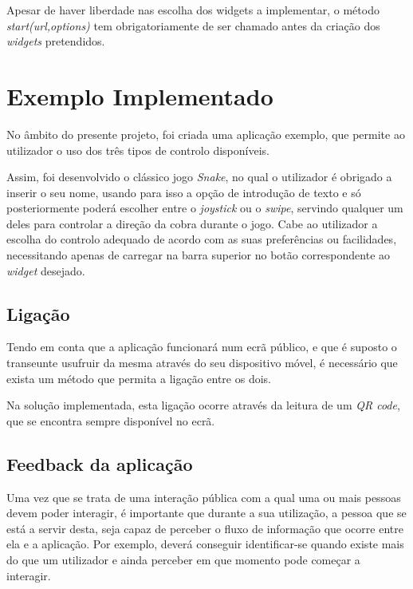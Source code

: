 	Apesar de haver liberdade nas escolha dos widgets a implementar, o método \textit{start(url,options)} tem obrigatoriamente de ser chamado antes da criação dos \textit{widgets} pretendidos. 


	
\section{Exemplo Implementado} \label{sec:exemplo}

	No âmbito do presente projeto, foi criada uma aplicação exemplo, que permite ao utilizador o uso dos três tipos de controlo disponíveis. 

	Assim, foi desenvolvido o clássico jogo \textit{Snake}, no qual o utilizador é obrigado a inserir o seu nome, usando para isso a opção de introdução de texto e só posteriormente poderá escolher entre o \textit{joystick} ou o \textit{swipe}, servindo qualquer um deles para controlar a direção da cobra durante o jogo. Cabe ao utilizador a escolha do controlo adequado de acordo com as suas preferências ou facilidades, necessitando apenas de carregar na barra superior no botão correspondente ao \textit{widget} desejado.

	\subsection{Ligação}

	Tendo em conta que a aplicação funcionará num ecrã público, e que é suposto o transeunte usufruir da mesma através do seu dispositivo móvel, é necessário que exista um método que permita a ligação entre os dois.

	Na solução implementada, esta ligação ocorre através da leitura de um \textit{QR code}, que se encontra sempre disponível no ecrã.

	\subsection{Feedback da aplicação}

	Uma vez que se trata de uma interação pública com a qual uma ou mais pessoas devem poder interagir, é importante que durante a sua utilização, a pessoa que se está a servir desta, seja capaz de perceber o fluxo de informação que ocorre entre ela e a aplicação. Por exemplo, deverá conseguir identificar-se quando existe mais do que um utilizador e ainda perceber em que momento pode começar a interagir.

